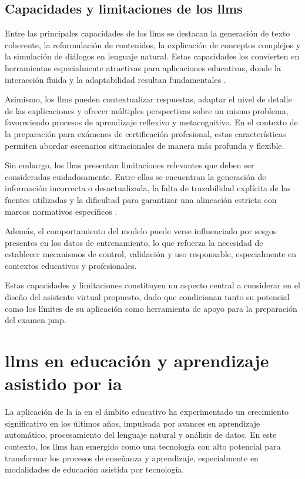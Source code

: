 \subsection{Capacidades y limitaciones de los \glspl{llm}}

Entre las principales capacidades de los \glspl{llm} se destacan la generación de texto coherente, la reformulación de contenidos, la explicación de conceptos complejos y la simulación de diálogos en lenguaje natural. Estas capacidades los convierten en herramientas especialmente atractivas para aplicaciones educativas, donde la interacción fluida y la adaptabilidad resultan fundamentales \parencite{kasneci2023chatgpt}.

Asimismo, los \glspl{llm} pueden contextualizar respuestas, adaptar el nivel de detalle de las explicaciones y ofrecer múltiples perspectivas sobre un mismo problema, favoreciendo procesos de aprendizaje reflexivo y metacognitivo. En el contexto de la preparación para exámenes de certificación profesional, estas características permiten abordar escenarios situacionales de manera más profunda y flexible.

Sin embargo, los \glspl{llm} presentan limitaciones relevantes que deben ser consideradas cuidadosamente. Entre ellas se encuentran la generación de información incorrecta o desactualizada, la falta de trazabilidad explícita de las fuentes utilizadas y la dificultad para garantizar una alineación estricta con marcos normativos específicos \parencite{huang2024hallucination}.

Además, el comportamiento del modelo puede verse influenciado por sesgos presentes en los datos de entrenamiento, lo que refuerza la necesidad de establecer mecanismos de control, validación y uso responsable, especialmente en contextos educativos y profesionales.

Estas capacidades y limitaciones constituyen un aspecto central a considerar en el diseño del asistente virtual propuesto, dado que condicionan tanto su potencial como los límites de su aplicación como herramienta de apoyo para la preparación del examen \gls{pmp}.

\section{\glspl{llm} en educación y aprendizaje asistido por \gls{ia}}

La aplicación de la \gls{ia} en el ámbito educativo ha experimentado un crecimiento significativo en los últimos años, impulsada por avances en aprendizaje automático, procesamiento del lenguaje natural y análisis de datos. En este contexto, los \glspl{llm} han emergido como una tecnología con alto potencial para transformar los procesos de enseñanza y aprendizaje, especialmente en modalidades de educación asistida por tecnología.

